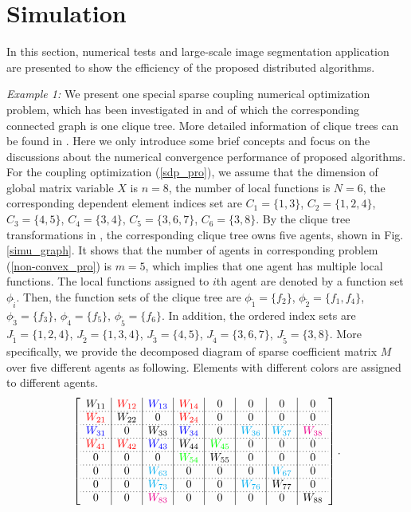 \documentclass[journal]{IEEEtran}
\begin{document}
\section{Simulation}\label{simulation}
In this section, numerical tests and large-scale image segmentation application are presented to show the efficiency of the proposed distributed algorithms.
\par \textit{Example 1:} We present one special sparse coupling numerical optimization problem, which has been investigated in \cite{dis_pd,distri_sed_tac,fast_dis} and of which the corresponding connected graph is one clique tree. More detailed information of clique trees can be found in \cite{dis_pd}. Here we only introduce some brief concepts and focus on the discussions about the numerical convergence performance of proposed algorithms. For the coupling optimization (\ref{sdp_pro}), we assume that the dimension of global matrix variable $X$ is $n=8$, the number of local functions is $N=6$, the corresponding dependent element indices set are $C_1=\{1,3\}$, $C_2=\{1,2,4\}$, $C_3=\{4,5\}$, $C_4=\{3,4\}$, $C_5=\{3,6,7\}$, $C_6=\{3,8\}$. By the clique tree transformations in \cite{distri_sed_tac}, the corresponding clique tree owns five agents, shown in Fig.\ref{simu_graph}. It shows that the number of agents in corresponding problem (\ref{non-convex_pro}) is $m=5$, which implies that one agent has multiple local functions. The local functions assigned to $i$th agent are denoted by a function set $\phi_{\tilde{i}}$. Then, the function sets of the clique tree are $\phi_{\tilde{1}}=\{f_2\}$, $\phi_{\tilde{2}}=\{f_1,f_4\}$, $\phi_{\tilde{3}}=\{f_3\}$, $\phi_{\tilde{4}}=\{f_5\}$, $\phi_{\tilde{5}}=\{f_6\}$. In addition, the ordered index sets are $J_{\tilde{1}}=\{1,2,4\}$, $J_{\tilde{2}}=\{1,3,4\}$, $J_{\tilde{3}}=\{4,5\}$, $J_{\tilde{4}}=\{3,6,7\}$, $J_{\tilde{5}}=\{3,8\}$. More specifically, we provide the decomposed diagram of sparse coefficient matrix $M$ over five different agents as following. Elements with different colors are assigned to different agents.
$$\left[
\begin{array}{c|c|c|c|c|c|c|c}
W_{11} &{\textcolor{red}{W_{12}}}&{\textcolor{blue}{W_{13}}}&{\textcolor{red}{W_{14}}}&0&0&0&0\\ \cdashline{1-8}[0.8pt/2pt]
{\textcolor{red}{W_{21}}} &W_{22}&0&{\textcolor{red}{W_{24}}}&0&0&0&0\\ \cdashline{1-8}[0.8pt/2pt]
{\textcolor{blue}{W_{31}}} &0&W_{33}&{\textcolor{blue}{W_{34}}}&0&{\textcolor{cyan}{W_{36}}}&{\textcolor{cyan}{W_{37}}}&{\textcolor{magenta}{W_{38}}}\\ \cdashline{1-8}[0.8pt/2pt]
{\textcolor{red}{W_{41}}} &{\textcolor{red}{W_{42}}}&{\textcolor{blue}{W_{43}}}&W_{44}&{\textcolor{green}{W_{45}}}&0&0&0\\ \cdashline{1-8}[0.8pt/2pt]
0 &0&0&{\textcolor{green}{W_{54}}}&W_{55}&0&0&0\\ \cdashline{1-8}[0.8pt/2pt]
0 &0&{\textcolor{cyan}{W_{63}}}&0&0&0&{\textcolor{cyan}{W_{67}}}&0\\ \cdashline{1-8}[0.8pt/2pt]
0 &0&{\textcolor{cyan}{W_{73}}}&0&0&{\textcolor{cyan}{W_{76}}}&W_{77}&0\\ \cdashline{1-8}[0.8pt/2pt]
0 &0&{\textcolor{magenta}{W_{83}}}&0&0&0&0&W_{88}
\end{array}
\right].$$
\end{document}
